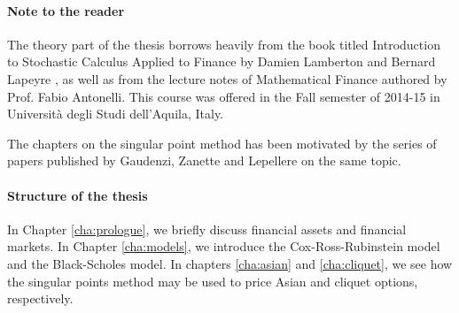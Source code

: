 \paragraph{Note to the reader}
The theory part of the thesis borrows heavily from the book titled Introduction to Stochastic Calculus Applied to Finance by Damien Lamberton and Bernard Lapeyre \cite[]{Lamberton1996}, as well as from the lecture notes of Mathematical Finance authored by Prof. Fabio Antonelli. This course was offered in the Fall semester of 2014-15 in Università degli Studi dell'Aquila, Italy.

The chapters on the singular point method has been motivated by the series of papers published by Gaudenzi, Zanette and Lepellere on the same topic.


\paragraph{Structure of the thesis}
In Chapter \ref{cha:prologue}, we briefly discuss financial assets and financial markets. In Chapter \ref{cha:models}, we introduce the Cox-Ross-Rubinstein model and the Black-Scholes model. In chapters \ref{cha:asian} and \ref{cha:cliquet}, we see how the singular points method may be used to price Asian and cliquet options, respectively. 


